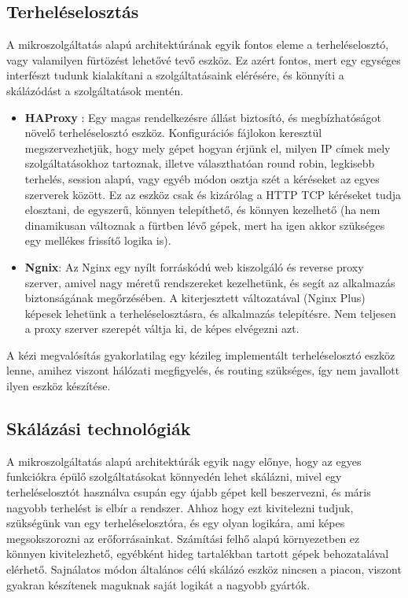 \documentclass[11pt,magyar,a4paper,twoside,]{report}
\begin{document}
\subsection{Terheléselosztás}\label{terheluxe9selosztuxe1s}

A mikroszolgáltatás alapú architektúrának egyik fontos eleme a
terheléselosztó, vagy valamilyen fürtözést lehetővé tevő eszköz. Ez
azért fontos, mert egy egységes interfészt tudunk kialakítani a
szolgáltatásaink elérésére, és könnyíti a skálázódást a szolgáltatások
mentén.

\begin{itemize}
\item
  \textbf{HAProxy}\citep{haproxy} \citep{LB-haproxy}: Egy magas
  rendelkezésre állást biztosító, és megbízhatóságot növelő
  terheléselosztó eszköz. Konfigurációs fájlokon keresztül
  megszervezhetjük, hogy mely gépet hogyan érjünk el, milyen IP címek
  mely szolgáltatásokhoz tartoznak, illetve választhatóan round robin,
  legkisebb terhelés, session alapú, vagy egyéb módon osztja szét a
  kéréseket az egyes szerverek között. Ez az eszköz csak és kizárólag a
  HTTP TCP kéréseket tudja elosztani, de egyszerű, könnyen telepíthető,
  és könnyen kezelhető (ha nem dinamikusan változnak a fürtben lévő
  gépek, mert ha igen akkor szükséges egy mellékes frissítő logika is).
\item
  \textbf{Ngnix}\citep{nginx}: Az Nginx egy nyílt forráskódú web
  kiszolgáló és reverse proxy szerver, amivel nagy méretű rendszereket
  kezelhetünk, és segít az alkalmazás biztonságának megőrzésében. A
  kiterjesztett változatával (Nginx Plus) képesek lehetünk a
  terheléselosztásra, és alkalmazás telepítésre. Nem teljesen a proxy
  szerver szerepét váltja ki, de képes elvégezni azt.
\end{itemize}

A kézi megvalósítás gyakorlatilag egy kézileg implementált
terheléselosztó eszköz lenne, amihez viszont hálózati megfigyelés, és
routing szükséges, így nem javallott ilyen eszköz készítése.

\subsection{Skálázási
technológiák}\label{skuxe1luxe1zuxe1si-technoluxf3giuxe1k}

A mikroszolgáltatás alapú architektúrák egyik nagy előnye, hogy az egyes
funkciókra épülő szolgáltatásokat könnyedén lehet skálázni, mivel egy
terheléselosztót használva csupán egy újabb gépet kell beszervezni, és
máris nagyobb terhelést is elbír a rendszer. Ahhoz hogy ezt kivitelezni
tudjuk, szükségünk van egy terheléselosztóra, és egy olyan logikára, ami
képes megsokszorozni az erőforrásainkat. Számítási felhő alapú
környezetben ez könnyen kivitelezhető, egyébként hideg tartalékban
tartott gépek behozatalával elérhető. Sajnálatos módon általános célú
skálázó eszköz nincsen a piacon, viszont gyakran készítenek maguknak
saját logikát a nagyobb gyártók.
\end{document}
